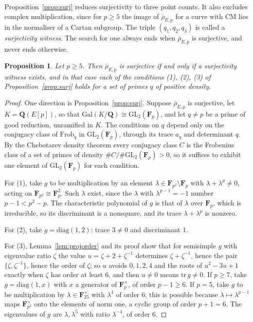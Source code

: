 \documentclass[11pt]{amsart}
\newtheorem{proposition}[theorem]{Proposition}
\theoremstyle{definition}
\newcommand{\Q}{\mathbf{Q}}
\newcommand{\F}{\mathbf{F}}
\newcommand{\GL}{\mathrm{GL}}
\newcommand{\Gal}{\mathrm{Gal}}
\newcommand{\rhobar}{\bar\rho_{E,p}}
\begin{document}
Proposition~\ref{prop:surj} reduces surjectivity to three point counts. It also excludes complex multiplication, since for $p\ge5$ the image of $\rhobar$ for a curve with CM lies in the normaliser of a Cartan subgroup. The triple $(q_1,q_2,q_3)$ is called a \emph{surjectivity witness}. The search for one always ends when $\rhobar$ is surjective, and never ends otherwise.

\begin{proposition}\label{prop:witnessexist}
Let $p\ge5$. Then $\rhobar$ is surjective if and only if a surjectivity witness exists, and in that case each of the conditions \textup{(1)}, \textup{(2)}, \textup{(3)} of Proposition~\ref{prop:surj} holds for a set of primes $q$ of positive density.
\end{proposition}

\begin{proof}
One direction is Proposition~\ref{prop:surj}. Suppose $\rhobar$ is surjective, let $K=\Q(E[p])$, so that $\Gal(K/\Q)\cong\GL_2(\F_p)$, and let $q\ne p$ be a prime of good reduction, unramified in $K$. The conditions on $q$ depend only on the conjugacy class of $\mathrm{Frob}_q$ in $\GL_2(\F_p)$, through its trace $a_q$ and determinant $q$. By the Chebotarev density theorem \cite[Ch.~VII, Thm.~13.4]{Neu99} every conjugacy class $C$ is the Frobenius class of a set of primes of density $\#C/\#\GL_2(\F_p)>0$, so it suffices to exhibit one element of $\GL_2(\F_p)$ for each condition.

For (1), take $g$ to be multiplication by an element $\lambda\in\F_{p^2}\setminus\F_p$ with $\lambda+\lambda^p\ne0$, acting on $\F_{p^2}\cong\F_p^2$. Such $\lambda$ exist, since the $\lambda$ with $\lambda^{p-1}=-1$ number $p-1<p^2-p$. The characteristic polynomial of $g$ is that of $\lambda$ over $\F_p$, which is irreducible, so its discriminant is a nonsquare, and its trace $\lambda+\lambda^p$ is nonzero.

For (2), take $g=\mathrm{diag}(1,2)$: trace $3\ne0$ and discriminant $1$.

For (3), Lemma~\ref{lem:projorder} and its proof show that for semisimple $g$ with eigenvalue ratio $\zeta$ the value $u=\zeta+2+\zeta^{-1}$ determines $\zeta+\zeta^{-1}$, hence the pair $\{\zeta,\zeta^{-1}\}$, hence the order of $\zeta$; so $u$ avoids $0,1,2,4$ and the roots of $u^2-3u+1$ exactly when $\zeta$ has order at least $6$, and then $u\ne0$ means $\mathrm{tr}\,g\neq0$. If $p\ge7$, take $g=\mathrm{diag}(1,x)$ with $x$ a generator of $\F_p^\times$, of order $p-1\ge6$. If $p=5$, take $g$ to be multiplication by $\lambda\in\F_{25}^\times$ with $\lambda^{4}$ of order $6$; this is possible because $\lambda\mapsto\lambda^{p-1}$ maps $\F_{p^2}^\times$ onto the elements of norm one, a cyclic group of order $p+1=6$. The eigenvalues of $g$ are $\lambda,\lambda^5$ with ratio $\lambda^{-4}$, of order $6$.
\end{proof}
\end{document}
